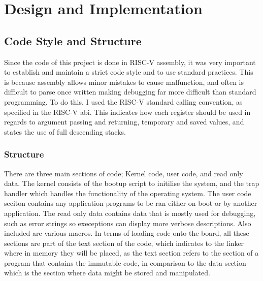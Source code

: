 \chapter{Design and Implementation}
\label{cha:design}
\section{Code Style and Structure}
Since the code of this project is done in RISC-V assembly, it was very important to establish and maintain a strict code style and to use standard practices. This is because assembly allows minor mistakes to cause malfunction, and often is difficult to parse once written making debugging far more difficult than standard programming. To do this, I used the RISC-V standard calling convention, as specified in the RISC-V \ac{abi}. This indicates how each register should be used in regards to argument passing and returning, temporary and saved values, and states the use of full descending stacks\cite{riscv_abi}.
\subsection{Structure}
There are three main sections of code; Kernel code, user code, and read only data. The kernel consists of the bootup script to initilise the system, and the trap handler which handles the functionality of the operating system. The user code seciton contains any application programs to be ran either on boot or by another application. The read only data contains data that is mostly used for debugging, such as error strings so execeptions can display more verbose descriptions. Also included are various macros. In terms of loading code onto the board, all these sections are part of the text section of the code, which indicates to the linker where in memory they will be placed, as the text section refers to the section of a program that contains the immutable code, in comparison to the data section which is the section where data might be stored and manipulated.
